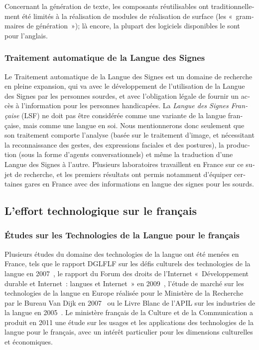 \begin{french}
\begin{multicols}{2}
Concernant la génération de texte, les composants réutilisables ont
traditionnellement été limités à la réalisation de modules de
réalisation de surface (les «~grammaires de génération~»); là encore,
la plupart des logiciels disponibles le sont pour l'anglais.

\subsubsection{Traitement automatique de la Langue des Signes}

Le Traitement automatique de la Langue des Signes est un domaine de
recherche en pleine expansion, qui va avec le développement de
l'utilisation de la Langue des Signes par les personnes sourdes, et
avec l'obligation légale de fournir un accès à l'information pour les
personnes handicapées. La {\em Langue des Signes Française} (LSF) ne
doit pas être considérée comme une variante de la langue française,
mais comme une langue en soi. Nous mentionnerons donc seulement que
son traitement comporte l'analyse (basée sur le traitement d'image, et
nécessitant la reconnaissance des gestes, des expressions faciales et
des postures), la production (sous la forme d'agents conversationnels)
et même la traduction d'une Langue des Signes à l'autre. Plusieurs
laboratoires travaillent en France sur ce sujet de recherche, et les
premiers résultats ont permis notamment d'équiper certaines gares en France avec
des informations en langue des signes pour les sourds.

\subsection{L'effort technologique sur le français}

\subsubsection{Études sur les Technologies de la Langue pour le français}

Plusieurs études du domaine des technologies de la langue ont été
menées en France, tels que le rapport DGLFLF sur les défis culturels
des technologies de la langue en 2007~\cite{dglflf07}, le rapport du
Forum des droits de l'Internet «~Développement durable et
  Internet~: langues et Internet~» en 2009~\cite{droitsinternet07},
l'étude de marché sur les technologies de la langue en Europe
réalisée pour le Ministère de la Recherche par le Bureau Van Dijk en
2007~\cite{vandijk07} ou le Livre Blanc de l'APIL sur les
industries de la langue en 2005~\cite{apil05}. Le ministère français
de la Culture et de la Communication a produit en 2011 une étude sur
les usages et les applications des technologies de la langue pour le
français, avec un intérêt particulier pour les dimensions culturelles
et économiques.


\end{multicols}
\end{french}
